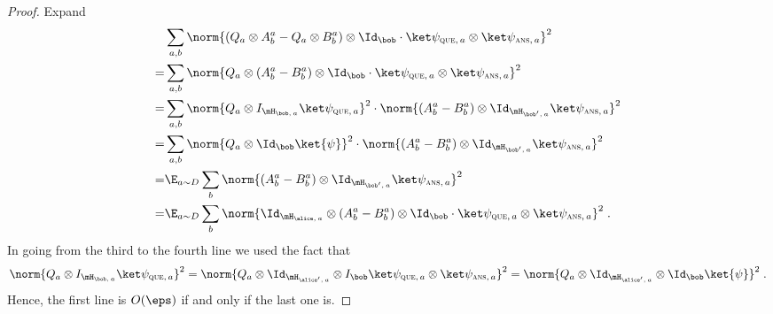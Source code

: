 \begin{proof}
 Expand
  \begin{align*}
    & \sum_{a,b} \norm{ (Q_a \otimes A^a_b - Q_a \otimes B^a_b) \otimes
      \Id_{\bob} \cdot \sq \otimes \sa }^2\\
    = & \sum_{a,b} \norm{ Q_a \otimes (A^a_b -  B^a_b) \otimes
        \Id_{\bob} \cdot \sq \otimes \sa}^2\\
    = & \sum_{a, b} \norm{ Q_a \otimes I_{\hbq} \sq}^2 \cdot
        \norm{  (A^a_b -  B^a_b) \otimes \Id_{\hba} \sa }^2\\
	= & \sum_{a, b} \norm{ Q_a \otimes \Id_{\bob} \ket{\psi}}^2 \cdot
      \norm{  (A^a_b -  B^a_b) \otimes \Id_{\hba} \sa }^2\\
    = & \E_{a \sim D} \sum_{b}
        \norm{  (A^a_b -  B^a_b) \otimes \Id_{\hba} \sa }^2\\
    = & \E_{a \sim D} \sum_{b}
      \norm{  \Id_{\haq} \otimes (A^a_b -  B^a_b) \otimes
        \Id_{\bob} \cdot \sq \otimes \sa }^2\;.
  \end{align*}
  In going from the third to the fourth line we used the fact that
  \[
    \norm{ Q_a \otimes I_{\hbq} \sq }^2 =
    \norm{ Q_a \otimes \Id_{\haa} \otimes I_{\bob} \sq \otimes \sa }^2
    = \norm{ Q_a \otimes \Id_{\haa} \otimes \Id_{\bob} \ket{\psi} }^2\;.
  \]
  Hence, the first line is $O(\eps)$ if and only if the last one is.
\end{proof}


